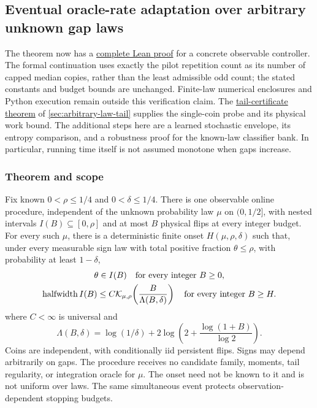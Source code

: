 \subsection{Eventual oracle-rate adaptation over arbitrary unknown gap laws}
\label{sec:arbitrary-law-adaptation}

The theorem now has a \href{https://github.com/davidiach/adaptive-threshold-estimation/blob/3f07e30a9a74a3b2b28c24ff5d017d3d60e093b1/lean/ThresholdHC/ArbitraryLawController/Full.lean}{complete Lean proof}
for a concrete observable controller. The formal continuation uses exactly
the pilot repetition count as its number of capped median copies, rather
than the least admissible odd count; the stated constants and budget bounds
are unchanged. Finite-law numerical enclosures and Python execution remain
outside this verification claim. The
\href{https://github.com/davidiach/adaptive-threshold-estimation/blob/9dbddf6622c17f37fb98c79bcf4407f579318a45/docs/ARBITRARY_LAW_TAIL.md}{tail-certificate theorem} of \cref{sec:arbitrary-law-tail} supplies the single-coin
probe and its physical work bound. The additional steps here are a learned
stochastic envelope, its entropy comparison, and a robustness proof for the
known-law classifier bank. In particular, running time itself is not assumed
monotone when gaps increase.

\subsubsection{Theorem and scope}

\begin{theorem}\label{thm:arbitrary-law-adaptation}
Fix known $0<\rho\le1/4$ and $0<\delta\le1/4$. There is one observable online
procedure, independent of the unknown probability law $\mu$ on $(0,1/2]$,
with nested intervals $I(B)\subseteq[0,\rho]$ and at most $B$ physical flips
at every integer budget. For every such $\mu$, there is a deterministic
finite onset $H(\mu,\rho,\delta)$ such that, under every measurable sign law
with total positive fraction $\theta\le\rho$, with probability at least
$1-\delta$,
\[
 \begin{gathered}
 \theta\in I(B)\quad\hbox{for every integer }B\ge0,\\
 \operatorname{halfwidth}I(B)
 \le C \mathcal K_{\mu,\rho}\!\left(\frac{B}{\Lambda(B,\delta)}\right)
 \quad\hbox{for every integer }B\ge H.
 \end{gathered}
\]
where $C<\infty$ is universal and
\[
 \Lambda(B,\delta)=\log(1/\delta)+
 2\log\left(2+\frac{\log(1+B)}{\log2}\right).
\]
Coins are independent, with conditionally iid persistent flips. Signs may
depend arbitrarily on gaps. The procedure receives no candidate family,
moments, tail regularity, or integration oracle for $\mu$. The onset need
not be known to it and is not uniform over laws. The same simultaneous event
protects observation-dependent stopping budgets.
\end{theorem}

